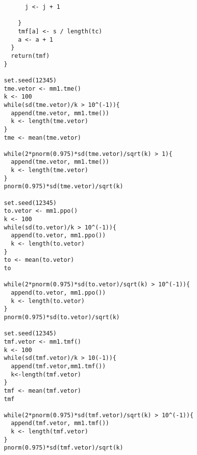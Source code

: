 \documentclass[a4paper,12pt,english,brazil]{article}
\begin{document}
\begin{lstlisting}
      j <- j + 1

    }
    tmf[a] <- s / length(tc)
    a <- a + 1
  }
  return(tmf)
}

set.seed(12345)
tme.vetor <- mm1.tme()
k <- 100
while(sd(tme.vetor)/k > 10^(-1)){
  append(tme.vetor, mm1.tme())
  k <- length(tme.vetor)
}
tme <- mean(tme.vetor)

while(2*pnorm(0.975)*sd(tme.vetor)/sqrt(k) > 1){
  append(tme.vetor, mm1.tme())
  k <- length(tme.vetor)
}
pnorm(0.975)*sd(tme.vetor)/sqrt(k)

set.seed(12345)
to.vetor <- mm1.ppo()
k <- 100
while(sd(to.vetor)/k > 10^(-1)){
  append(to.vetor, mm1.ppo())
  k <- length(to.vetor)
}
to <- mean(to.vetor)
to

while(2*pnorm(0.975)*sd(to.vetor)/sqrt(k) > 10^(-1)){
  append(to.vetor, mm1.ppo())
  k <- length(to.vetor)
}
pnorm(0.975)*sd(to.vetor)/sqrt(k)

set.seed(12345)
tmf.vetor <- mm1.tmf()
k <- 100
while(sd(tmf.vetor)/k > 10(-1)){
  append(tmf.vetor,mm1.tmf())
  k<-length(tmf.vetor)
}
tmf <- mean(tmf.vetor)
tmf

while(2*pnorm(0.975)*sd(tmf.vetor)/sqrt(k) > 10^(-1)){
  append(tmf.vetor, mm1.tmf())
  k <- length(tmf.vetor)
}
pnorm(0.975)*sd(tmf.vetor)/sqrt(k)


\end{lstlisting}




\end{document}
